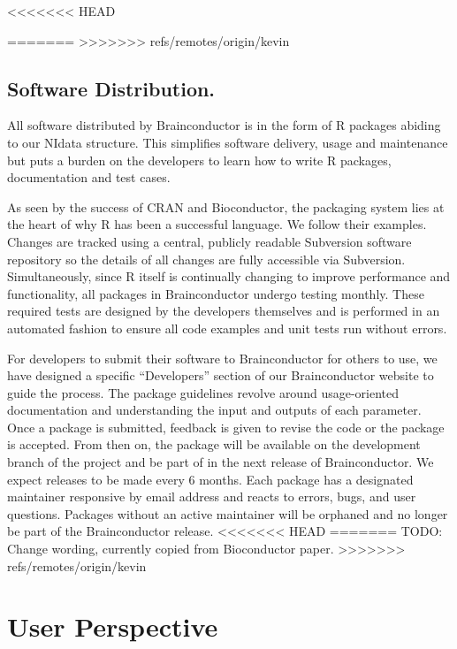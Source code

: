 \documentclass{nature}
\begin{document}
<<<<<<< HEAD

=======
>>>>>>> refs/remotes/origin/kevin



\subsection{Software Distribution.}

All software distributed by Brainconductor is in the form of R packages abiding
to our NIdata structure. This
simplifies software delivery, usage and maintenance but puts a burden on the
developers
to learn how to write R packages, documentation and test cases.

As seen by the success of CRAN and Bioconductor, the packaging system lies
at the heart of why R has been a successful language. We follow their examples.
Changes are tracked using a central, publicly readable Subversion software
repository
so the details of all changes are fully accessible via Subversion.
Simultaneously, since
R itself is continually changing to improve performance and functionality, all
packages
in Brainconductor undergo testing monthly. These required tests are designed by
the
developers themselves and is performed in an automated fashion to ensure
all code examples and unit tests run without errors.

For developers to submit their software to Brainconductor for others to use,
we have designed a specific ``Developers'' section of our Brainconductor website
to guide the process. The package guidelines revolve around usage-oriented
documentation and understanding the input and outputs of each parameter.
 Once
a package is submitted, feedback is given to revise the code or the package is
accepted.
From then on, the package will be available on the
development branch of the project and be part of in the next release of
Brainconductor.
We expect releases to be made every 6 months.
Each package has a designated maintainer responsive by email address and reacts
to
errors, bugs, and user questions. Packages without an active maintainer will be
orphaned and no longer be part of the Brainconductor release.
<<<<<<< HEAD
=======
{\color{red}TODO: Change wording, currently copied from Bioconductor paper.}
>>>>>>> refs/remotes/origin/kevin


\section{User Perspective}
\end{document}
